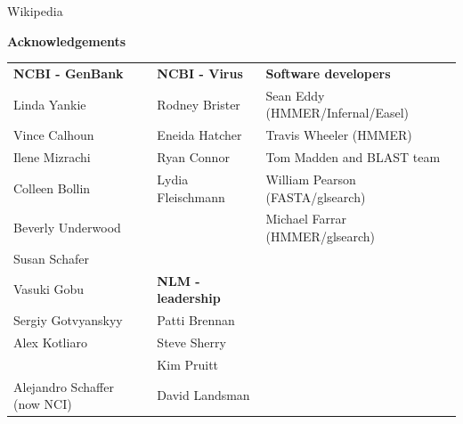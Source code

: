 \documentclass[landscape]{slides}
\begin{document}
\begin{slide}
\begin{center}

Wikipedia

\end{center}
\vfill
\end{slide}
\begin{slide}

\large
\begin{center}
\large{\textbf{Acknowledgements}} \\

\normalsize
\vspace{0.75in}

\small
\begin{tabular}{l|l|l}
\textbf{NCBI - GenBank}          & \textbf{NCBI - Virus}      &  \textbf{Software developers} \\
Linda Yankie                     & Rodney Brister             & Sean Eddy (HMMER/Infernal/Easel)\\
Vince Calhoun                    & Eneida Hatcher             & Travis Wheeler (HMMER)\\
Ilene Mizrachi                   & Ryan Connor                & Tom Madden and BLAST team \\
Colleen Bollin                   & Lydia Fleischmann          & William Pearson (FASTA/glsearch) \\
Beverly Underwood                &                            & Michael Farrar (HMMER/glsearch) \\
Susan Schafer                    &                            & \\
Vasuki Gobu                      & \textbf{NLM - leadership}  & \\
Sergiy Gotvyanskyy               & Patti Brennan              & \\
Alex Kotliaro                    & Steve Sherry               & \\
                                 & Kim Pruitt                 & \\
Alejandro Schaffer (now NCI)     & David Landsman             & \\
\end{tabular}


\end{center}
\end{slide}
\end{document}

